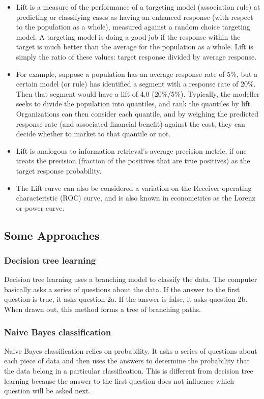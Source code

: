 \begin{itemize}
\item Lift is a measure of the performance of a targeting model (association rule) at predicting or classifying cases as having an enhanced response (with respect to the population as a whole), measured against a random choice targeting model. A targeting model is doing a good job if the response within the target is much better than the average for the population as a whole. Lift is simply the ratio of these values: target response divided by average response.
\item For example, suppose a population has an average response rate of 5\%, but a certain model (or rule) has identified a segment with a response rate of 20\%. Then that segment would have a lift of 4.0 (20\%/5\%).
Typically, the modeller seeks to divide the population into quantiles, and rank the quantiles by lift. Organizations can then consider each quantile, and by weighing the predicted response rate (and associated financial benefit) against the cost, they can decide whether to market to that quantile or not.
\item Lift is analogous to information retrieval's average precision metric, if one treats the precision (fraction of the positives that are true positives) as the target response probability.
\item The Lift curve can also be considered a variation on the Receiver operating characteristic (ROC) curve, and is also known in econometrics as the Lorenz or power curve.
\end{itemize}

\newpage
\subsection{Some Approaches}
\subsubsection*{Decision tree learning}
Decision tree learning uses a branching model to classify the data. The computer basically asks a series of questions about the data. If the answer to the first question is true, it asks question 2a. If the answer is false, it asks question 2b. When drawn out, this method forms a tree of branching paths.

\subsubsection*{Naive Bayes classification }
Naive Bayes classification relies on probability. It asks a series of questions about each piece of data and then uses the answers to determine the probability that the data belong in a particular classification. This is different from decision tree learning because the answer to the first question does not influence which question will be asked next.

